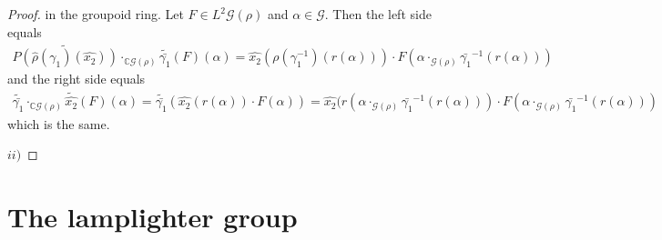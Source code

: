 \documentclass[12pt,a4paper]{scrartcl}
\numberwithin{equation}{section}
\newcommand{\C}{\mathbb{C}} %
\newcommand{\2}{\mathbb{Z} / 2 \mathbb{Z}}
\newcommand{\G}{\mathcal{G}}
\newcommand{\1}{\bar{1}}
\newcommand{\0}{\bar{0}}
\begin{document}
\begin{proof}
	in the groupoid ring.
	Let $F \in L^2 \G(\rho)$ and $\alpha \in \G$. Then the left side equals
	\begin{align*}
		\widetilde{P(\hat{\rho}(\gamma_1)(\hat{x_2}))} \cdot_{\C\G(\rho)} \widetilde{\bar{\gamma_1}}(F)(\alpha) = \hat{x_2}(\rho (\gamma_1^{-1})( r(\alpha))) \cdot F(\alpha \cdot_{\G (\rho)} \bar{\gamma_1}^{-1}(r(\alpha)))  
	\end{align*}
	and the right side equals
	\begin{align*}
		\widetilde{\bar{\gamma_1}} \cdot_{\C\G(\rho)} \tilde{\hat{x_2}}(F)(\alpha) = \widetilde{\bar{\gamma_1}}(\hat{x_2}(r(\alpha)) \cdot F(\alpha)) = \hat{x_2}(r(\alpha \cdot_{\G (\rho)} \bar{\gamma_1}^{-1}(r(\alpha))) \cdot F(\alpha \cdot_{\G (\rho)} \bar{\gamma_1}^{-1}(r(\alpha)))
	\end{align*}
	which is the same.
	
	$ii)$ 
\end{proof}

\section{The lamplighter group}
\end{document}
